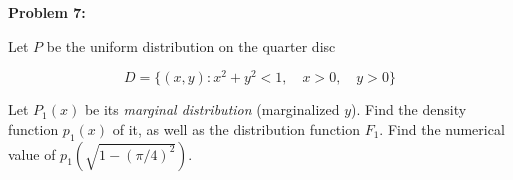 \textbf{Problem 7:}

\singlespacing

Let $P$ be the uniform distribution on the quarter disc

\begin{equation}
    D = \{(x, y): x^2 + y^2 < 1,\quad x > 0,\quad y > 0\}
\end{equation}

Let $P_1(x)$ be its \textit{marginal distribution} (marginalized $y$).
Find the density function $p_1(x)$ of it, as well as the
distribution function $F_1$. Find the numerical value of $p_1 (\sqrt{1 - (\pi/4)^2})$.

\singlespacing
















